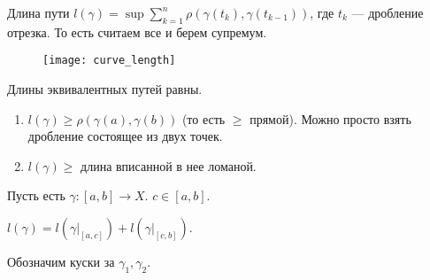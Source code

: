 \begin{definition}
    Длина пути $l(\gamma) = \sup \sum\limits_{k=1}^n \rho(\gamma(t_k), \gamma(t_{k-1}))$, где  $t_k$ --- дробление отрезка. То есть считаем все и берем супремум.
    \begin{figure}[h!]
        \texttt{[image: curve\_length]}
    \end{figure}
\end{definition}
\begin{remark}
    Длины эквивалентных путей равны.
\end{remark}
\begin{properties}
    \begin{enumerate}
        \item $l(\gamma) \ge \rho(\gamma(a), \gamma(b))$ (то есть $\ge$ прямой). Можно просто взять дробление состоящее из двух точек.
        \item $l(\gamma) \ge$ длина вписанной в нее ломаной.
    \end{enumerate}
\end{properties}
\begin{theorem}
    Пусть есть $\gamma\!: [a, b] \to X$.  $c \in [a, b]$. 

    $l(\gamma) = l(\gamma \Big|_{[a, c]}) + l(\gamma \Big|_{[c, b]})$.

    Обозначим куски за  $\gamma_1, \gamma_2$.
\end{theorem}
